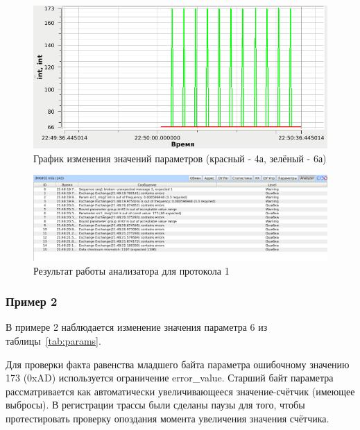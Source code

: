 

\begin{figure}[H]
 \centering
 \includegraphics[scale=0.6]{tests/param_bind/graph}
 \caption{График изменения значений параметров (красный - 4а, зелёный - 6а)}
 \label{fig:param_bind_graph}
\end{figure}

\begin{figure}[H]
 \centering
 \includegraphics[scale=0.4]{tests/param_bind/report}
 \caption{Результат работы анализатора для протокола 1}
 \label{fig:param_bind_report}
\end{figure}

\subsubsection{Пример 2}

В примере 2 наблюдается изменение значения параметра 6 из 
таблицы~\ref{tab:params}. 

Для проверки факта равенства младшего байта параметра ошибочному значению 173 
(0xAD) используется ограничение error\_value. Старший байт параметра 
рассматривается как автоматически увеличивающееся значение-счётчик (имеющее 
выбросы). В регистрации трассы были сделаны паузы для того, чтобы 
протестировать проверку опоздания момента увеличения значения счётчика.



